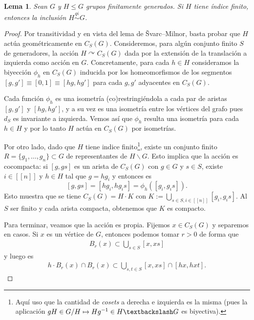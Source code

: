\documentclass[11pt]{article}
\theoremstyle{colored}
\newtheorem{lemma}{Lema}
\newcommand{\nat}[1]{[\![#1]\!]}
\newcommand{\qi}{\stackrel{qi}{\sim}}
\begin{document}
\begin{lemma} Sean $G$ y $H \leq G$ grupos finitamente generados. Si $H$ tiene índice finito, entonces la inclusión $H \qi G$.
\end{lemma}
\begin{proof} Por transitividad y en vista del lema de Švarc–Milnor, basta probar que $H$ actúa geométricamente en $C_S(G)$. Consideremos, para algún conjunto finito $S$ de generadores, la acción $H \curvearrowright C_S(G)$ dada por la extensión de la translación a izquierda como acción en $G$. Concretamente, para cada $h \in H$ consideramos la biyección $\phi_h$ en $C_S(G)$ inducida por los homeomorfismos de los segmentos $[g,g'] \equiv [0,1] \equiv [hg,hg']$ para cada $g,g'$ adyacentes en $C_S(G)$. 

Cada función $\phi_h$ es una isometría (co)restringiéndola a cada par de aristas $[g,g']$ y $[hg,hg']$, y a su vez es una isometría entre los vértices del grafo pues $d_S$ es invariante a izquierda. Vemos así que $\phi_h$ resulta una isometría para cada $h \in H$ y por lo tanto $H$ actúa en $C_S(G)$ por isometrías.

Por otro lado, dado que $H$ tiene indice finito\footnote{Aquí uso que la cantidad de \textit{cosets} a derecha e izquierda es la misma (pues la aplicación $gH \in G/H \mapsto Hg^{-1} \in H\textbackslash G$ es biyectiva).}, existe un conjunto finito $R = \{g_1, \dots, g_n\} \subset G$ de representantes de $H \backslash G$. Esto implica que la acción es cocompacta: si $[g,gs]$ es un arista de $C_S(G)$ con $g \in G$ y $s \in S$, existe $i \in \nat{n}$ y $h \in H$ tal que $g = hg_i$ y entonces es
\[
[g,gs] = [hg_i,hg_is] = \phi_h([g_i,g_is]).
\]
Esto muestra que se tiene $C_S(G) = H \cdot K$ con $K := \bigcup_{s \in S, i\in\nat{n}}[g_i,g_is]$. Al $S$ ser finito y cada arista compacta, obtenemos que $K$ es compacto.

Para terminar, veamos que la acción es propia. Fijemos $x \in C_S(G)$ y separemos en casos. Si $x$ es un vértice de $G$, entonces podemos tomar $r > 0$ de forma que
\begin{align*}
B_r(x) \subset \bigcup_{s \in S}[x,xs]
\end{align*}
y luego es
\begin{align*}
h \cdot B_r(x) \cap B_r(x) \subset \bigcup_{s,t \in S} [x,xs] \cap [hx,hxt].
\end{align*}


\end{proof}
\end{document}
